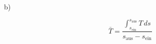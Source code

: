 b)

\[
\bar{T} = \frac{\int_{s_{\text{ein}}}^{s_{\text{aus}}} T \, ds}{s_{\text{aus}} - s_{\text{ein}}}
\]